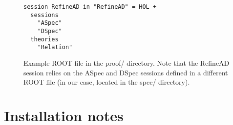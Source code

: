 \documentclass[twoside]{memoir}
\begin{document}
\begin{figure}[htpb]
    \centering
    \begin{lstlisting}[language=isabelle]
session RefineAD in "RefineAD" = HOL +
  sessions
    "ASpec"
    "DSpec"
  theories
    "Relation"
    \end{lstlisting}
    
    \caption{Example ROOT file in the proof/ directory. Note that the RefineAD session relies on the ASpec and DSpec sessions defined in a different ROOT file (in our case, located in the spec/ directory).}
    \label{fig:isabelle-root-file-proof}
\end{figure}

\section{Installation notes}


\backmatter

\end{document}
